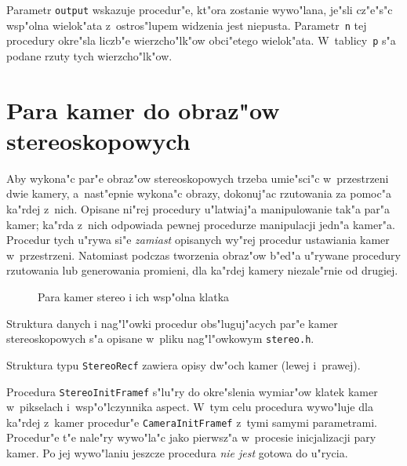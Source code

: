 \begin{sloppypar}
Parametr \texttt{output} wskazuje procedur"e, kt"ora zostanie wywo"lana,
je"sli cz"e"s"c wsp"ol\-na wielok"ata z~ostros"lupem widzenia jest niepusta.
Parametr~\texttt{n} tej procedury okre"sla liczb"e wierzcho"lk"ow
obci"etego wielok"ata. W~tablicy~\texttt{p} s"a podane rzuty tych
wierzcho"lk"ow.%
\end{sloppypar}


\newpage
\section{Para kamer do obraz"ow stereoskopowych}

Aby wykona"c par"e obraz"ow stereoskopowych trzeba umie"sci"c w~przestrzeni
dwie kamery, a~nast"epnie wykona"c obrazy, dokonuj"ac rzutowania za pomoc"a
ka"rdej z~nich. Opisane ni"rej procedury u"latwiaj"a manipulowanie tak"a
par"a kamer; ka"rda z~nich odpowiada pewnej procedurze manipulacji jedn"a
kamer"a. Procedur tych u"rywa si"e \emph{zamiast} opisanych wy"rej procedur
ustawiania kamer w~przestrzeni. Natomiast podczas tworzenia obraz"ow
b"ed"a u"rywane procedury rzutowania lub generowania promieni, dla ka"rdej
kamery niezale"rnie od drugiej.
\begin{figure}[ht]
  \centerline{}
  \caption{Para kamer stereo i ich wsp"olna klatka}
\end{figure}%

Struktura danych i nag"l"owki procedur obs"luguj"acych par"e kamer
stereoskopowych s"a opisane w~pliku nag"l"owkowym \texttt{stereo.h}.

\vspace{\bigskipamount}
Struktura typu \texttt{StereoRecf} zawiera opisy dw"och kamer (lewej
i~prawej).

\vspace{\bigskipamount}
\begin{sloppypar}
Procedura \texttt{StereoInitFramef} s"lu"ry do okre"slenia wymiar"ow klatek
kamer w~pikselach i~wsp"o"lczynnika aspect. W~tym celu procedura wywo"luje
dla ka"rdej z~kamer procedur"e \texttt{CameraInitFramef} z~tymi samymi
parametrami. Procedur"e t"e nale"ry wywo"la"c jako pierwsz"a w~procesie
inicjalizacji pary kamer. Po jej wywo"laniu jeszcze procedura \emph{nie jest}
gotowa do u"rycia.%
\end{sloppypar}

